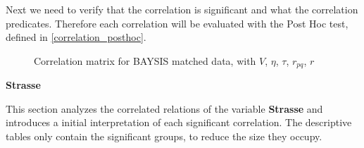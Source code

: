 Next we need to verify that the correlation is significant and what the correlation predicates. Therefore each correlation will be evaluated with the Post Hoc test, defined in \autoref{correlation_posthoc}.


\begin{figure}[!ht]
	\centering
	\caption{Correlation matrix for BAYSIS matched data, with $V$, $\eta$, $\tau$, $r_{pq}$, $r$}
	\label{img:correlation_matrix_matched_cramers}
\end{figure}

\pagebreak

\Large
\centerline{\textbf{Strasse}}
\normalsize
This section analyzes the correlated relations of the variable \textbf{Strasse} and introduces a initial interpretation of each significant correlation. The descriptive tables only contain the significant groups, to reduce the size they occupy.

